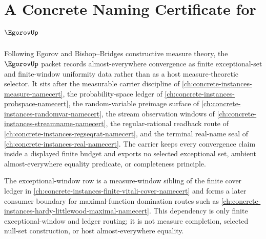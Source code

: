 \chapter{A Concrete Naming Certificate for $\EgorovUp$}
\label{ch:concrete-instances-egorov-namecert}

Following Egorov and Bishop--Bridges constructive measure theory, the $\EgorovUp$ packet records almost-everywhere convergence as finite exceptional-set and finite-window uniformity data rather than as a host measure-theoretic selector. It sits after the measurable carrier discipline of \autoref{ch:concrete-instances-measure-namecert}, the probability-space ledger of \autoref{ch:concrete-instances-probspace-namecert}, the random-variable preimage surface of \autoref{ch:concrete-instances-randomvar-namecert}, the stream observation windows of \autoref{ch:concrete-instances-streamname-namecert}, the regular-rational readback route of \autoref{ch:concrete-instances-regseqrat-namecert}, and the terminal real-name seal of \autoref{ch:concrete-instances-real-namecert}. The carrier keeps every convergence claim inside a displayed finite budget and exports no selected exceptional set, ambient almost-everywhere equality predicate, or completeness principle.

The exceptional-window row is a measure-window sibling of the finite cover ledger in \autoref{ch:concrete-instances-finite-vitali-cover-namecert} and forms a later consumer boundary for maximal-function domination routes such as \autoref{ch:concrete-instances-hardy-littlewood-maximal-namecert}. This dependency is only finite exceptional-window and ledger routing; it is not measure completion, selected null-set construction, or host almost-everywhere equality.


